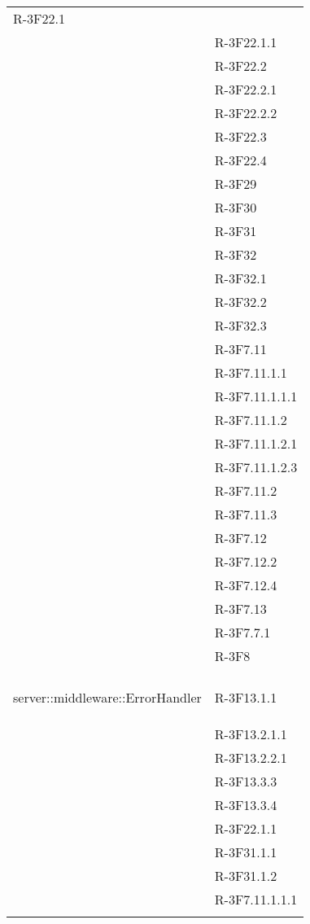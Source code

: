 \begin{longtable}{l p{3cm}}
R-3F22.1 \tabularnewline &

R-3F22.1.1 \tabularnewline &

R-3F22.2 \tabularnewline &

R-3F22.2.1 \tabularnewline &

R-3F22.2.2 \tabularnewline &

R-3F22.3 \tabularnewline &

R-3F22.4 \tabularnewline &

R-3F29 \tabularnewline &

R-3F30 \tabularnewline &

R-3F31 \tabularnewline &

R-3F32 \tabularnewline &

R-3F32.1 \tabularnewline &

R-3F32.2 \tabularnewline &

R-3F32.3 \tabularnewline &

R-3F7.11 \tabularnewline &

R-3F7.11.1.1 \tabularnewline &

R-3F7.11.1.1.1 \tabularnewline &

R-3F7.11.1.2 \tabularnewline &

R-3F7.11.1.2.1 \tabularnewline &

R-3F7.11.1.2.3 \tabularnewline &

R-3F7.11.2 \tabularnewline &

R-3F7.11.3 \tabularnewline &

R-3F7.12 \tabularnewline &

R-3F7.12.2 \tabularnewline &

R-3F7.12.4 \tabularnewline &

R-3F7.13 \tabularnewline &

R-3F7.7.1 \tabularnewline &

R-3F8 \tabularnewline &\tabularnewline
\midrule
\hypertarget{server::middleware::ErrorHandler}{server::middleware::ErrorHandler} & R-3F13.1.1 \tabularnewline &

R-3F13.2.1.1 \tabularnewline &

R-3F13.2.2.1 \tabularnewline &

R-3F13.3.3 \tabularnewline &

R-3F13.3.4 \tabularnewline &

R-3F22.1.1 \tabularnewline &

R-3F31.1.1 \tabularnewline &

R-3F31.1.2 \tabularnewline &

R-3F7.11.1.1.1 \tabularnewline &


\end{longtable}

